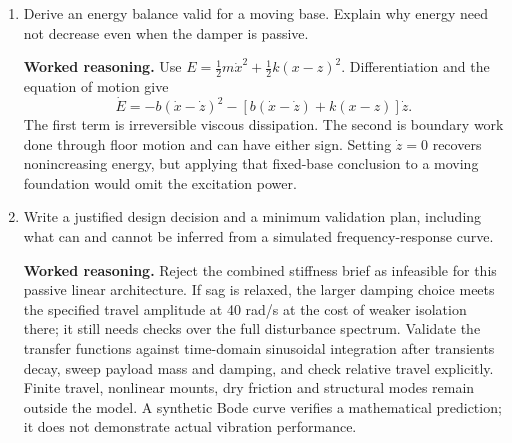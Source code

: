 \documentclass[10pt,a4paper]{article}
\newcommand{\answer}{\par\smallskip\textbf{Worked reasoning.} }
\begin{document}
\begin{enumerate}
\item Derive an energy balance valid for a moving base. Explain why energy need not decrease even when the damper is passive.
\answer Use $E=\tfrac12m\dot x^2+\tfrac12k(x-z)^2$. Differentiation and the equation of motion give
\[
\dot E=-b(\dot x-\dot z)^2-
[b(\dot x-\dot z)+k(x-z)]\dot z.
\]
The first term is irreversible viscous dissipation. The second is boundary work done through floor motion and can have either sign. Setting $\dot z=0$ recovers nonincreasing energy, but applying that fixed-base conclusion to a moving foundation would omit the excitation power.
\item Write a justified design decision and a minimum validation plan, including what can and cannot be inferred from a simulated frequency-response curve.
\answer Reject the combined stiffness brief as infeasible for this passive linear architecture. If sag is relaxed, the larger damping choice meets the specified travel amplitude at 40 rad/s at the cost of weaker isolation there; it still needs checks over the full disturbance spectrum. Validate the transfer functions against time-domain sinusoidal integration after transients decay, sweep payload mass and damping, and check relative travel explicitly. Finite travel, nonlinear mounts, dry friction and structural modes remain outside the model. A synthetic Bode curve verifies a mathematical prediction; it does not demonstrate actual vibration performance.
\end{enumerate}
\end{document}
